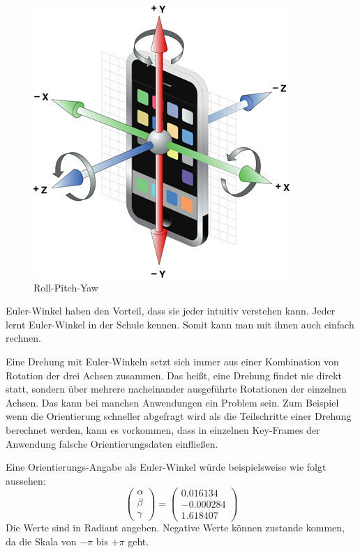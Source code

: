 \begin{figure}[htb]
\centering
\includegraphics[scale=0.8]{figures/apple-axes}
\caption{Roll-Pitch-Yaw \cite{apple:001}}
\label{fig:apple-axes}
\end{figure}

Euler-Winkel haben den Vorteil, dass sie jeder intuitiv verstehen kann. Jeder lernt Euler-Winkel in der Schule kennen. Somit kann man mit ihnen auch einfach rechnen.

Eine Drehung mit Euler-Winkeln setzt sich immer aus einer Kombination von Rotation der drei Achsen zusammen. Das heißt, eine Drehung findet nie direkt statt, sondern über mehrere nacheinander ausgeführte Rotationen der einzelnen Achsen. Das kann bei manchen Anwendungen ein Problem sein. Zum Beispiel wenn die Orientierung schneller abgefragt wird als die Teilschritte einer Drehung berechnet werden, kann es vorkommen, dass in einzelnen Key-Frames der Anwendung falsche Orientierungsdaten einfließen.

Eine Orientierungs-Angabe als Euler-Winkel würde beispielsweise wie folgt aussehen: 
$$
\begin{pmatrix}
    \alpha\\ 
    \beta\\ 
    \gamma
  \end{pmatrix} =
\begin{pmatrix}
    0.016134\\ 
    -0.000284\\ 
    1.618407
  \end{pmatrix} 
$$
Die Werte sind in Radiant angeben. Negative Werte können zustande kommen, da die Skala von $-\pi$ bis $+\pi$ geht.

